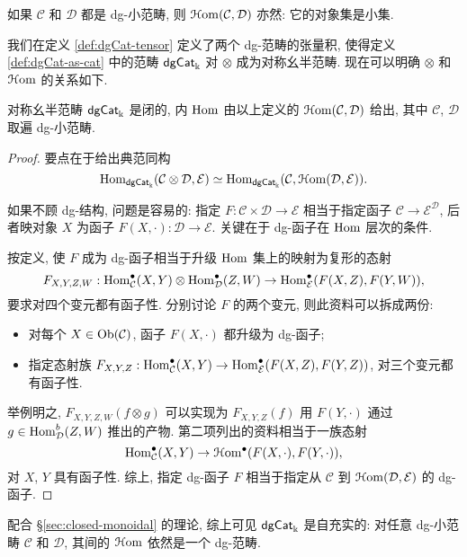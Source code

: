 如果 $\mathcal{C}$ 和 $\mathcal{D}$ 都是 dg-小范畴, 则 $\EuScript{H}\mathrm{om}(\mathcal{C}, \mathcal{D})$ 亦然: 它的对象集是小集.

我们在定义 \ref{def:dgCat-tensor} 定义了两个 dg-范畴的张量积, 使得定义 \ref{def:dgCat-as-cat} 中的范畴 $\mathsf{dgCat}_{\Bbbk}$ 对 $\otimes$ 成为对称幺半范畴. 现在可以明确 $\otimes$ 和 $\EuScript{H}\mathrm{om}$ 的关系如下.

\begin{proposition}\label{prop:dgCat-closed}
	对称幺半范畴 $\mathsf{dgCat}_{\Bbbk}$ 是闭的, 内 $\operatorname{Hom}$ 由以上定义的 $\EuScript{H}\mathrm{om}(\mathcal{C}, \mathcal{D})$ 给出, 其中 $\mathcal{C}$, $\mathcal{D}$ 取遍 dg-小范畴.
\end{proposition}
\begin{proof}
	要点在于给出典范同构
	\[ \operatorname{Hom}_{\mathsf{dgCat}_{\Bbbk}}(\mathcal{C} \otimes \mathcal{D}, \mathcal{E}) \simeq \operatorname{Hom}_{\mathsf{dgCat}_{\Bbbk}}(\mathcal{C}, \EuScript{H}\mathrm{om}(\mathcal{D}, \mathcal{E}) ). \]
	
	如果不顾 dg-结构, 问题是容易的: 指定 $F: \mathcal{C} \times \mathcal{D} \to \mathcal{E}$ 相当于指定函子 $\mathcal{C} \to \mathcal{E}^{\mathcal{D}}$, 后者映对象 $X$ 为函子 $F(X, \cdot): \mathcal{D} \to \mathcal{E}$. 关键在于 dg-函子在 $\operatorname{Hom}$ 层次的条件.
	
	按定义, 使 $F$ 成为 dg-函子相当于升级 $\operatorname{Hom}$ 集上的映射为复形的态射
	\[ F_{X, Y, Z, W}: \operatorname{Hom}^\bullet_{\mathcal{C}}(X, Y) \otimes \operatorname{Hom}^\bullet_{\mathcal{D}}(Z, W) \to \operatorname{Hom}^\bullet_{\mathcal{E}}(F(X, Z), F(Y, W)), \]
	要求对四个变元都有函子性. 分别讨论 $F$ 的两个变元, 则此资料可以拆成两份:
	\begin{itemize}
		\item 对每个 $X \in \operatorname{Ob}(\mathcal{C})$, 函子 $F(X, \cdot)$ 都升级为 dg-函子;
		\item 指定态射族 $F_{X, Y, Z}: \operatorname{Hom}^\bullet_{\mathcal{C}}(X, Y) \to \operatorname{Hom}^\bullet_{\mathcal{E}}(F(X, Z), F(Y, Z))$, 对三个变元都有函子性.
	\end{itemize}
	举例明之, $F_{X, Y, Z, W}(f \otimes g)$ 可以实现为 $F_{X, Y, Z}(f)$ 用 $F(Y, \cdot)$ 通过 $g \in \operatorname{Hom}^b_{\mathcal{D}}(Z, W)$ 推出的产物. 第二项列出的资料相当于一族态射
	\[ \operatorname{Hom}^\bullet_{\mathcal{C}}(X, Y) \to \EuScript{H}\mathrm{om}^\bullet(F(X, \cdot), F(Y, \cdot)), \]
	对 $X$, $Y$ 具有函子性. 综上, 指定 dg-函子 $F$ 相当于指定从 $\mathcal{C}$ 到 $\EuScript{H}\mathrm{om}(\mathcal{D}, \mathcal{E})$ 的 dg-函子.
\end{proof}

配合 \S\ref{sec:closed-monoidal} 的理论, 综上可见 $\mathsf{dgCat}_{\Bbbk}$ 是自充实的: 对任意 dg-小范畴 $\mathcal{C}$ 和 $\mathcal{D}$, 其间的 $\EuScript{H}\mathrm{om}$ 依然是一个 dg-范畴.

